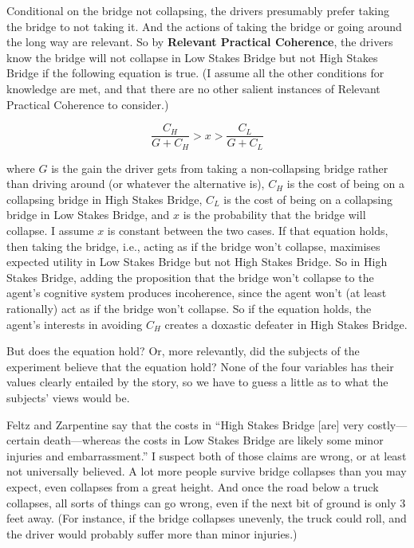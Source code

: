 \documentclass[oneside]{book}
\begin{document}
Conditional on the bridge not collapsing, the drivers presumably prefer taking the bridge to not taking it. And the actions of taking the bridge or going around the long way are relevant. So by \textbf{Relevant Practical Coherence}, the drivers know the bridge will not collapse in Low Stakes Bridge but not High Stakes Bridge  if the following equation is true. (I assume all the other conditions for knowledge are met, and that there are no other salient instances of Relevant Practical Coherence to consider.)

\begin{equation*}
\frac{C_H}{G + C_H} > x > \frac{C_L}{G + C_L}
\end{equation*}

\noindent where $G$ is the gain the driver gets from taking a non-collapsing bridge rather than driving around (or whatever the alternative is), $C_H$ is the cost of being on a collapsing bridge in High Stakes Bridge, $C_L$ is the cost of being on a collapsing bridge in Low Stakes Bridge, and $x$ is the probability that the bridge will collapse. I assume $x$ is constant between the two cases. If that equation holds, then taking the bridge, i.e., acting as if the bridge won't collapse, maximises expected utility in Low Stakes Bridge but not High Stakes Bridge. So in High Stakes Bridge, adding the proposition that the bridge won't collapse to the agent's cognitive system produces incoherence, since the agent won't (at least rationally) act as if the bridge won't collapse. So if the equation holds, the agent's interests in avoiding $C_H$ creates a doxastic defeater in High Stakes Bridge.

But does the equation hold? Or, more relevantly, did the subjects of the experiment believe that the equation hold? None of the four variables has their values clearly entailed by the story, so we have to guess a little as to what the subjects' views would be. 

Feltz and Zarpentine say that the costs in ``High Stakes Bridge [are] very costly---certain death---whereas the costs in Low Stakes Bridge are likely some minor injuries and embarrassment.'' \cite[702]{FeltzZarpentine2010} I suspect both of those claims are wrong, or at least not universally believed. A lot more people survive bridge collapses than you may expect, even collapses from a great height. And once the road below a truck collapses, all sorts of things can go wrong, even if the next bit of ground is only 3 feet away. (For instance, if the bridge collapses unevenly, the truck could roll, and the driver would probably suffer more than minor injuries.)
\end{document}
